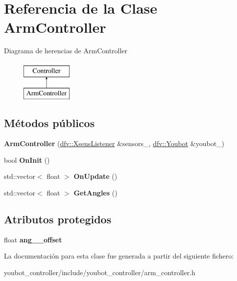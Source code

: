 \hypertarget{classArmController}{\section{\-Referencia de la \-Clase \-Arm\-Controller}
\label{classArmController}
}
\-Diagrama de herencias de \-Arm\-Controller\begin{figure}[H]
\begin{center}
\leavevmode
\includegraphics[height=2.000000cm]{classArmController}
\end{center}
\end{figure}
\subsection*{\-Métodos públicos}
\begin{DoxyCompactItemize}
\item 
\hypertarget{classArmController_a9b970431a48ef344677bf4d0c0809fba}{{\bfseries \-Arm\-Controller} (\hyperlink{classdfv_1_1XsensListener}{dfv\-::\-Xsens\-Listener} \&sensors\-\_\-, \hyperlink{classdfv_1_1Youbot}{dfv\-::\-Youbot} \&youbot\-\_\-)}\label{classArmController_a9b970431a48ef344677bf4d0c0809fba}

\item 
\hypertarget{classArmController_a5e4570f96d8dfdfdd4ec029779f15eae}{bool {\bfseries \-On\-Init} ()}\label{classArmController_a5e4570f96d8dfdfdd4ec029779f15eae}

\item 
\hypertarget{classArmController_aa0102892d8753117349d2f406c30c736}{std\-::vector$<$ float $>$ {\bfseries \-On\-Update} ()}\label{classArmController_aa0102892d8753117349d2f406c30c736}

\item 
\hypertarget{classArmController_a210e66d9372edd1f05ba67969aef7d1f}{std\-::vector$<$ float $>$ {\bfseries \-Get\-Angles} ()}\label{classArmController_a210e66d9372edd1f05ba67969aef7d1f}

\end{DoxyCompactItemize}
\subsection*{\-Atributos protegidos}
\begin{DoxyCompactItemize}
\item 
\hypertarget{classArmController_a2c9f1294097ba76e38d820d51809209d}{float {\bfseries ang\-\_\-\_\-offset}}\label{classArmController_a2c9f1294097ba76e38d820d51809209d}

\end{DoxyCompactItemize}


\-La documentación para esta clase fue generada a partir del siguiente fichero\-:\begin{DoxyCompactItemize}
\item 
youbot\-\_\-controller/include/youbot\-\_\-controller/arm\-\_\-controller.\-h\end{DoxyCompactItemize}
